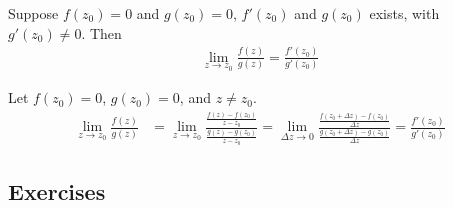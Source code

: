 \documentclass[12pt, english]{book}
\makeatletter
\renewenvironment{proof}[1][\proofname]{\par
	\pushQED{\qed}%
	\normalfont \topsep6\p@\@plus6\p@\relax
	\list{}{%
		\settowidth{\leftmargin}{\itshape\proofname:\hskip\labelsep}%
		\setlength{\labelwidth}{0pt}%
		\setlength{\itemindent}{-\leftmargin}%
	}%
	\item[\hskip\labelsep\itshape#1\@addpunct{:}]\ignorespaces
	}{ \popQED\endlist\@endpefalse}
\makeatother
\begin{document}
	\begin{theorem} 
		\label{L'Hopital's Rule - Complex}
		Suppose \(f(z_0) = 0\) and \(g(z_0) = 0\), \(f'(z_0)\) and \(g(z_0)\) exists, with \(g'(z_0) \neq 0\). Then 
		\begin{align*}
			\lim_{z \rightarrow z_0} \frac{f(z)}{g(z)} = \frac{f'(z_0)}{g'(z_0)}
		\end{align*}
	\end{theorem}
	\begin{proof}
		Let \(f(z_0) = 0\), \(g(z_0) = 0\), and \(z \neq z_0\).
		\begin{align*}
			\lim_{z \rightarrow z_0} \frac{f(z)}{g(z)}
				&= \lim_{z \rightarrow z_0} \frac{\frac{f(z)-f(z_0)}{z-z_0}}{\frac{g(z)-g(z_0)}{z-z_0}}
				= \lim_{\Delta z \rightarrow 0}
				\frac{\frac{f(z_0 + \Delta z)-f(z_0)}{\Delta z}}{\frac{g(z_0 + \Delta z)-g(z_0)}{\Delta z}}
				=\frac{f'(z_0)}{g'(z_0)}
		\end{align*}
	\end{proof}
	
	
	\subsection{Exercises}
	
\end{document}
